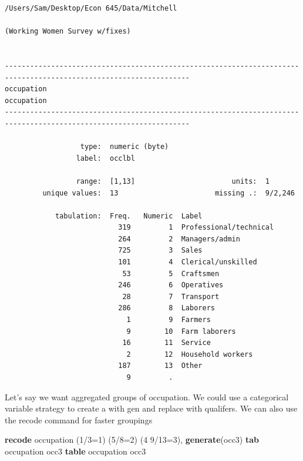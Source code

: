 \documentclass[
]{book}
\newenvironment{Shaded}{\begin{snugshade}}{\end{snugshade}}
\newcommand{\KeywordTok}[1]{\textcolor[rgb]{0.13,0.29,0.53}{\textbf{#1}}}
\newcommand{\NormalTok}[1]{#1}
\begin{document}
\begin{verbatim}
/Users/Sam/Desktop/Econ 645/Data/Mitchell

(Working Women Survey w/fixes)


------------------------------------------------------------------------------------------------------------------
occupation                                                                                              occupation
------------------------------------------------------------------------------------------------------------------

                  type:  numeric (byte)
                 label:  occlbl

                 range:  [1,13]                       units:  1
         unique values:  13                       missing .:  9/2,246

            tabulation:  Freq.   Numeric  Label
                           319         1  Professional/technical
                           264         2  Managers/admin
                           725         3  Sales
                           101         4  Clerical/unskilled
                            53         5  Craftsmen
                           246         6  Operatives
                            28         7  Transport
                           286         8  Laborers
                             1         9  Farmers
                             9        10  Farm laborers
                            16        11  Service
                             2        12  Household workers
                           187        13  Other
                             9         .  
\end{verbatim}

Let's say we want aggregated groups of occupation. We could use a categorical variable strategy to create a with gen and replace with qualifers. We can also use the recode command for faster groupings

\begin{Shaded}
\begin{Highlighting}[]
\KeywordTok{recode}\NormalTok{ occupation (1/3=1) (5/8=2) (4 9/13=3), }\KeywordTok{generate}\NormalTok{(occ3)}
\KeywordTok{tab}\NormalTok{ occupation occ3}
\KeywordTok{table}\NormalTok{ occupation occ3}
\end{Highlighting}
\end{Shaded}
\end{document}
